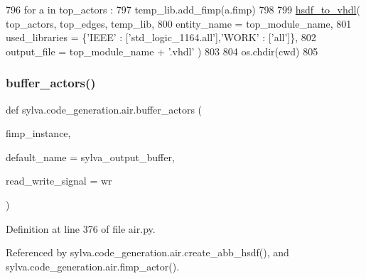\begin{DoxyCode}
796   \textcolor{keywordflow}{for} a \textcolor{keywordflow}{in} top\_actors :
797     temp\_lib.add\_fimp(a.fimp)
798 
799   \hyperlink{namespacesylva_1_1code__generation_1_1hsdf__to__vhdl_a0725288caa57a5c518a1b9c2683291fa}{hsdf\_to\_vhdl}( top\_actors, top\_edges, temp\_lib,
800     entity\_name = top\_module\_name,
801     used\_libraries = \{\textcolor{stringliteral}{'IEEE'} : [\textcolor{stringliteral}{'std\_logic\_1164.all'}],\textcolor{stringliteral}{'WORK'} : [\textcolor{stringliteral}{'all'}]\},
802     output\_file = top\_module\_name + \textcolor{stringliteral}{'.vhdl'} )
803 
804   os.chdir(cwd)
805 \end{DoxyCode}
\mbox{\label{namespacesylva_1_1code__generation_1_1air_a2437e8f4411d574d2a354bee377e1e31}} 
\subsubsection{\texorpdfstring{buffer\+\_\+actors()}{buffer\_actors()}}
{\footnotesize\ttfamily def sylva.\+code\+\_\+generation.\+air.\+buffer\+\_\+actors (\begin{DoxyParamCaption}\item[{}]{fimp\+\_\+instance,  }\item[{}]{default\+\_\+name = {\ttfamily \textquotesingle{}sylva\+\_\+output\+\_\+buffer\textquotesingle{}},  }\item[{}]{read\+\_\+write\+\_\+signal = {\ttfamily \textquotesingle{}wr\textquotesingle{}} }\end{DoxyParamCaption})}



Definition at line 376 of file air.\+py.



Referenced by sylva.\+code\+\_\+generation.\+air.\+create\+\_\+abb\+\_\+hsdf(), and sylva.\+code\+\_\+generation.\+air.\+fimp\+\_\+actor().


